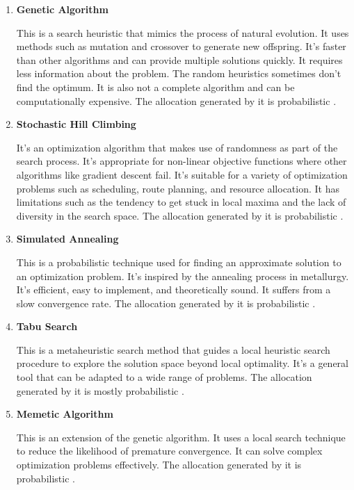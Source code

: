 \begin{enumerate}
  \item \textbf{Genetic Algorithm}

        This is a search heuristic that mimics the process of natural evolution. It uses methods such as mutation and crossover to generate new offspring. It's faster than other algorithms and can provide multiple solutions quickly. It requires less information about the problem. The random heuristics sometimes don't find the optimum. It is also not a complete algorithm and can be computationally expensive. The allocation generated by it is probabilistic \cite{lambora2019genetic}.

  \item \textbf{Stochastic Hill Climbing}

        It's an optimization algorithm that makes use of randomness as part of the search process. It's appropriate for non-linear objective functions where other algorithms like gradient descent fail. It's suitable for a variety of optimization problems such as scheduling, route planning, and resource allocation. It has limitations such as the tendency to get stuck in local maxima and the lack of diversity in the search space. The allocation generated by it is probabilistic \cite{juels1995stochastic}.

  \item \textbf{Simulated Annealing}

        This is a probabilistic technique used for finding an approximate solution to an optimization problem. It's inspired by the annealing process in metallurgy. It's efficient, easy to implement, and theoretically sound. It suffers from a slow convergence rate. The allocation generated by it is probabilistic \cite{bertsimas1993simulated}.

  \item \textbf{Tabu Search}

        This is a metaheuristic search method that guides a local heuristic search procedure to explore the solution space beyond local optimality. It's a general tool that can be adapted to a wide range of problems. The allocation generated by it is mostly probabilistic \cite{glover1990tabu}.

  \item \textbf{Memetic Algorithm}

        This is an extension of the genetic algorithm. It uses a local search technique to reduce the likelihood of premature convergence. It can solve complex optimization problems effectively. The allocation generated by it is probabilistic \cite{neri2012memetic}.


\end{enumerate}
